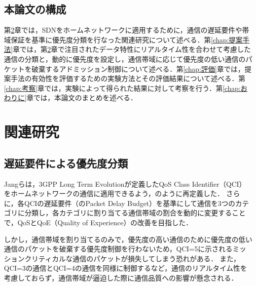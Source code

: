 \documentclass[a4paper,11pt,uplatex]{ujreport}
\begin{document}
\section{本論文の構成}
\label{sec:本論文の構成}

  第\ref{chap:関連研究}章では，SDNをホームネットワークに適用するために，通信の遅延要件や帯域保証を基準に優先度分類を行なった関連研究について述べる．第\ref{chap:提案手法}章では，第\ref{chap:関連研究}章で注目されたデータ特性にリアルタイム性を合わせて考慮した通信の分類と，動的に優先度を設定し，通信帯域に応じて優先度の低い通信のパケットを破棄するアドミッション制御について述べる．第\ref{chap:評価}章では，提案手法の有効性を評価するための実験方法とその評価結果について述べる．第\ref{chap:考察}章では，実験によって得られた結果に対して考察を行う．第\ref{chap:おわりに}章では，本論文のまとめを述べる．


\chapter{関連研究}
\label{chap:関連研究}

\section{遅延要件による優先度分類}
\label{sec:遅延要件による優先度分類}

  Jangらは，3GPP Long Term Evolutionが定義したQoS Class Identifier（QCI）をホームネットワークの通信に適用できるよう，のように再定義した\cite{Framework}．
  さらに，各QCIの遅延要件（のPacket Delay Budget）を基準にして通信を3つのカテゴリに分類し，各カテゴリに割り当てる通信帯域の割合を動的に変更することで，QoSとQoE（Quality of Experience）の改善を目指した\cite{Framework2}．\par
  しかし，通信帯域を割り当てるのみで，優先度の高い通信のために優先度の低い通信のパケットを破棄する優先度制御を行わないため，QCI=5に示されるミッションクリティカルな通信のパケットが損失してしまう恐れがある．
  また，QCI=3の通信とQCI=4の通信を同様に制御するなど，通信のリアルタイム性を考慮しておらず，通信帯域が逼迫した際に通信品質への影響が懸念される．

\end{document}
